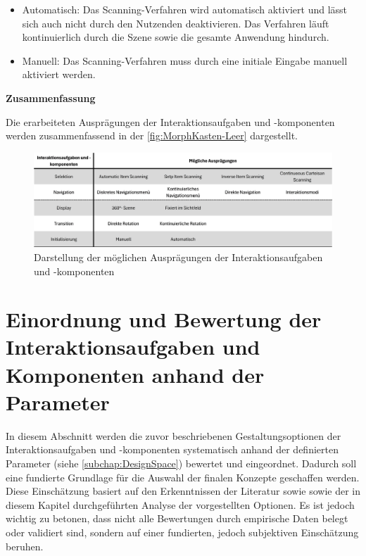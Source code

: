 \begin{itemize}
    \item Automatisch: Das Scanning-Verfahren wird automatisch aktiviert und lässt sich auch nicht durch den Nutzenden deaktivieren. Das Verfahren läuft kontinuierlich durch die Szene sowie die gesamte Anwendung hindurch.
    \item Manuell: Das Scanning-Verfahren muss durch eine initiale Eingabe manuell aktiviert werden. 
\end{itemize}

{\normalfont \bfseries Zusammenfassung}

Die erarbeiteten Ausprägungen der Interaktionsaufgaben und -komponenten werden zusammenfassend in der \autoref{fig:MorphKasten-Leer} dargestellt. 

\begin{figure}[tbh]
    \centering
    \includegraphics[width=1.0\textwidth]{images/MorphKasten-Ausgang2.png}
    \caption{Darstellung der möglichen Ausprägungen der Interaktionsaufgaben und -komponenten}
    \label{fig:MorphKasten-Leer}
\end{figure}

\section{Einordnung und Bewertung der Interaktionsaufgaben und Komponenten anhand der Parameter}
\label{subchap:EinordnungNachParameter}

In diesem Abschnitt werden die zuvor beschriebenen Gestaltungsoptionen der Interaktionsaufgaben und -komponenten systematisch anhand der definierten Parameter (siehe \autoref{subchap:DesignSpace}) bewertet und eingeordnet. Dadurch soll eine fundierte Grundlage für die Auswahl der finalen Konzepte geschaffen werden. Diese Einschätzung basiert auf den Erkenntnissen der Literatur sowie sowie der in diesem Kapitel durchgeführten Analyse der vorgestellten Optionen. Es ist jedoch wichtig zu betonen, dass nicht alle Bewertungen durch empirische Daten belegt oder validiert sind, sondern auf einer fundierten, jedoch subjektiven Einschätzung beruhen. 

